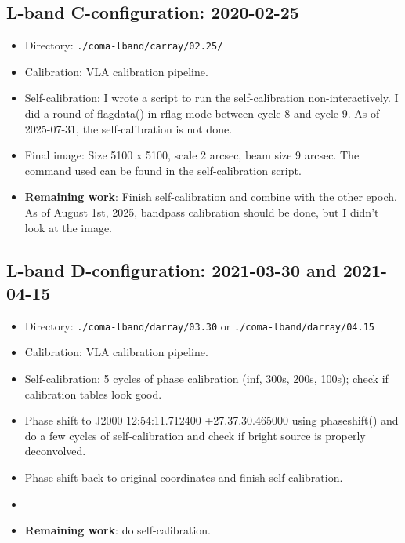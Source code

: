 \documentclass[11pt,letterpaper]{article}
\begin{document}
\subsection{L-band C-configuration: 2020-02-25}
\begin{itemize}
    \item Directory: \verb|./coma-lband/carray/02.25/|
    \item Calibration: VLA calibration pipeline.
    \item Self-calibration: I wrote a script to run the self-calibration non-interactively. I did a round of flagdata() in rflag mode between cycle 8 and cycle 9. As of 2025-07-31, the self-calibration is not done.
    \item Final image: Size 5100 x 5100, scale 2 arcsec, beam size 9 arcsec. The command used can be found in the self-calibration script.
    \item \textbf{Remaining work}: Finish self-calibration and combine with the other epoch. As of August 1st, 2025, bandpass calibration should be done, but I didn't look at the image. 
\end{itemize}

\subsection{L-band D-configuration: 2021-03-30 and 2021-04-15}
\begin{itemize}
    \item Directory: \verb|./coma-lband/darray/03.30| or \verb|./coma-lband/darray/04.15|
    \item Calibration: VLA calibration pipeline.
    \item Self-calibration: 5 cycles of phase calibration (inf, 300s, 200s, 100s); check if calibration tables look good.
    \item Phase shift to J2000 12:54:11.712400 +27.37.30.465000 using phaseshift() and do a few cycles of self-calibration and check if bright source is properly deconvolved.
    \item Phase shift back to original coordinates and finish self-calibration.
    \item 
    \item \textbf{Remaining work}: do self-calibration.
\end{itemize}

\end{document}
